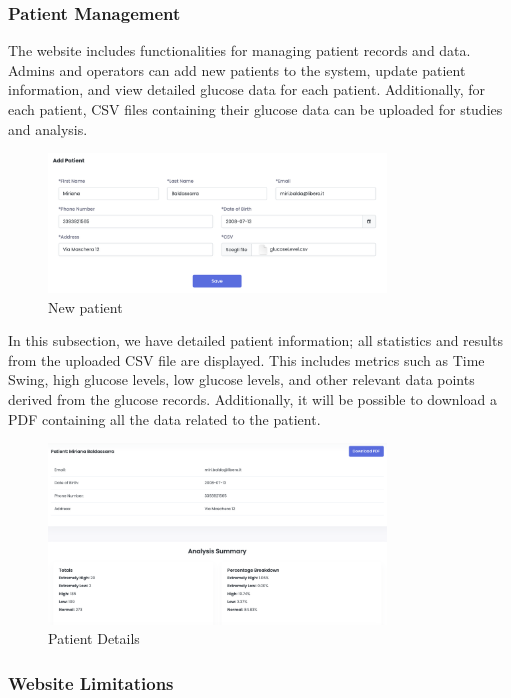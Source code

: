 \documentclass{article}
\begin{document}
\subsubsection{Patient Management}
The website includes functionalities for managing patient records and data. Admins and operators can add new patients to the system, update patient information, and view detailed glucose data for each patient. Additionally, for each patient, CSV files containing their glucose data can be uploaded for studies and analysis.

\begin{figure}[h!]
    \centering
    \includegraphics[width=0.8\textwidth]{Images/Web/new_patient.png}
    \caption{New patient}
    \label{fig:New Patient}
\end{figure}

In this subsection, we have detailed patient information; all statistics and results from the uploaded CSV file are displayed. This includes metrics such as Time Swing, high glucose levels, low glucose levels, and other relevant data points derived from the glucose records. Additionally, it will be possible to download a PDF containing all the data related to the patient.

\begin{figure}[h!]
    \centering
    \includegraphics[width=0.8\textwidth]{Images/Web/detail_patient.png}
    \caption{Patient Details}
    \label{fig:Patient Details}
\end{figure}

\subsubsection{Website Limitations}
\end{document}
